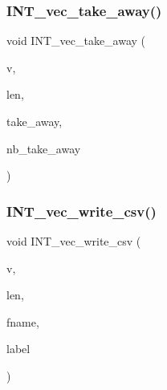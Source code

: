 \mbox{\label{util_8_c_a5e3e555b59057fec5f63486c07fed043}} 
\subsubsection{\texorpdfstring{I\+N\+T\+\_\+vec\+\_\+take\+\_\+away()}{INT\_vec\_take\_away()}}
{\footnotesize\ttfamily void I\+N\+T\+\_\+vec\+\_\+take\+\_\+away (\begin{DoxyParamCaption}\item[{\mbox{\hyperlink{galois_8h_a09fddde158a3a20bd2dcadb609de11dc}{I\+NT}} $\ast$}]{v,  }\item[{\mbox{\hyperlink{galois_8h_a09fddde158a3a20bd2dcadb609de11dc}{I\+NT}} \&}]{len,  }\item[{\mbox{\hyperlink{galois_8h_a09fddde158a3a20bd2dcadb609de11dc}{I\+NT}} $\ast$}]{take\+\_\+away,  }\item[{\mbox{\hyperlink{galois_8h_a09fddde158a3a20bd2dcadb609de11dc}{I\+NT}}}]{nb\+\_\+take\+\_\+away }\end{DoxyParamCaption})}

\mbox{\label{util_8_c_af2e3e8931ad88b6499ced61caac79240}} 
\subsubsection{\texorpdfstring{I\+N\+T\+\_\+vec\+\_\+write\+\_\+csv()}{INT\_vec\_write\_csv()}}
{\footnotesize\ttfamily void I\+N\+T\+\_\+vec\+\_\+write\+\_\+csv (\begin{DoxyParamCaption}\item[{\mbox{\hyperlink{galois_8h_a09fddde158a3a20bd2dcadb609de11dc}{I\+NT}} $\ast$}]{v,  }\item[{\mbox{\hyperlink{galois_8h_a09fddde158a3a20bd2dcadb609de11dc}{I\+NT}}}]{len,  }\item[{const \mbox{\hyperlink{galois_8h_ab6cc7b4aeb6ea31aba2b3fbfc83ff5e6}{B\+Y\+TE}} $\ast$}]{fname,  }\item[{const \mbox{\hyperlink{galois_8h_ab6cc7b4aeb6ea31aba2b3fbfc83ff5e6}{B\+Y\+TE}} $\ast$}]{label }\end{DoxyParamCaption})}

